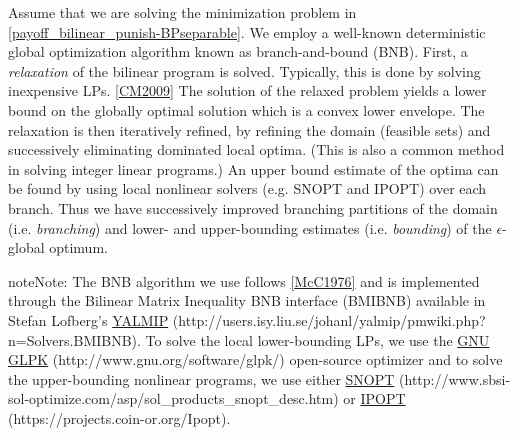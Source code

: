 \documentclass[a4paper,10pt,english]{sphinxmanual}
\begin{document}
\begin{DUlineblock}{0em}
\item[] 
\end{DUlineblock}

Assume that we are solving the minimization problem in \eqref{payoff_bilinear_punish-BPseparable}. We employ a well-known deterministic global optimization algorithm known as branch-and-bound (BNB). First, a \emph{relaxation} of the bilinear program is solved. Typically, this is done by solving inexpensive LPs. {\hyperref[payoff_bilinear_punish:cm2009]{{[}CM2009{]}}} The solution of the relaxed problem yields a lower bound on the globally optimal solution which is a convex lower envelope. The relaxation is then iteratively refined, by refining the domain (feasible sets) and successively eliminating dominated local optima. (This is also a common method in solving integer linear programs.) An upper bound estimate of the optima can be found by using local nonlinear solvers (e.g. SNOPT and IPOPT) over each branch. Thus we have successively improved branching partitions of the domain (i.e. \emph{branching}) and lower- and upper-bounding estimates (i.e. \emph{bounding}) of the \(\epsilon\)-global optimum.

\begin{notice}{note}{Note:}
The BNB algorithm we use follows {\hyperref[sampling:mcc1976]{{[}McC1976{]}}} and is implemented through the
Bilinear Matrix Inequality BNB interface (BMIBNB) available in Stefan
Lofberg's \href{http://users.isy.liu.se/johanl/yalmip/pmwiki.php?n=Solvers.BMIBNB}{YALMIP} (http://users.isy.liu.se/johanl/yalmip/pmwiki.php?n=Solvers.BMIBNB). To solve the local lower-bounding LPs, we use the \href{http://www.gnu.org/software/glpk/}{GNU GLPK} (http://www.gnu.org/software/glpk/) open-source optimizer and to solve the upper-bounding nonlinear programs, we use either \href{http://www.sbsi-sol-optimize.com/asp/sol\_products\_snopt\_desc.htm}{SNOPT} (http://www.sbsi-sol-optimize.com/asp/sol\_products\_snopt\_desc.htm) or \href{https://projects.coin-or.org/Ipopt}{IPOPT} (https://projects.coin-or.org/Ipopt).
\end{notice}
\end{document}
